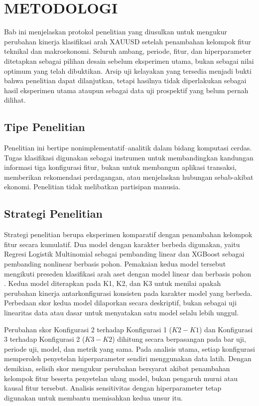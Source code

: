 \chapter{METODOLOGI}

Bab ini menjelaskan protokol penelitian yang diusulkan untuk mengukur perubahan kinerja klasifikasi arah XAUUSD setelah penambahan kelompok fitur teknikal dan makroekonomi. Seluruh ambang, periode, fitur, dan hiperparameter ditetapkan sebagai pilihan desain sebelum eksperimen utama, bukan sebagai nilai optimum yang telah dibuktikan. Arsip uji kelayakan yang tersedia menjadi bukti bahwa penelitian dapat dilanjutkan, tetapi hasilnya tidak diperlakukan sebagai hasil eksperimen utama ataupun sebagai data uji prospektif yang belum pernah dilihat.

\section{Tipe Penelitian}

Penelitian ini bertipe nonimplementatif--analitik dalam bidang komputasi cerdas. Tugas klasifikasi digunakan sebagai instrumen untuk membandingkan kandungan informasi tiga konfigurasi fitur, bukan untuk membangun aplikasi transaksi, memberikan rekomendasi perdagangan, atau menjelaskan hubungan sebab-akibat ekonomi. Penelitian tidak melibatkan partisipan manusia.

\section{Strategi Penelitian}

Strategi penelitian berupa eksperimen komparatif dengan penambahan kelompok fitur secara kumulatif. Dua model dengan karakter berbeda digunakan, yaitu Regresi Logistik Multinomial sebagai pembanding linear dan XGBoost sebagai pembanding nonlinear berbasis pohon. Pemakaian kedua model tersebut mengikuti preseden klasifikasi arah aset dengan model linear dan berbasis pohon \parencite{sadorsky2021predicting,basher2022forecasting}. Kedua model diterapkan pada K1, K2, dan K3 untuk menilai apakah perubahan kinerja antarkonfigurasi konsisten pada karakter model yang berbeda. Perbedaan skor kedua model dilaporkan secara deskriptif, bukan sebagai uji linearitas data atau dasar untuk menyatakan satu model selalu lebih unggul.

Perubahan skor Konfigurasi 2 terhadap Konfigurasi 1 ($K2-K1$) dan Konfigurasi 3 terhadap Konfigurasi 2 ($K3-K2$) dihitung secara berpasangan pada bar uji, periode uji, model, dan metrik yang sama. Pada analisis utama, setiap konfigurasi memperoleh penyetelan hiperparameter sendiri menggunakan data latih. Dengan demikian, selisih skor mengukur perubahan bersyarat akibat penambahan kelompok fitur beserta penyetelan ulang model, bukan pengaruh murni atau kausal fitur tersebut. Analisis sensitivitas dengan hiperparameter tetap digunakan untuk membantu memisahkan kedua unsur itu.

